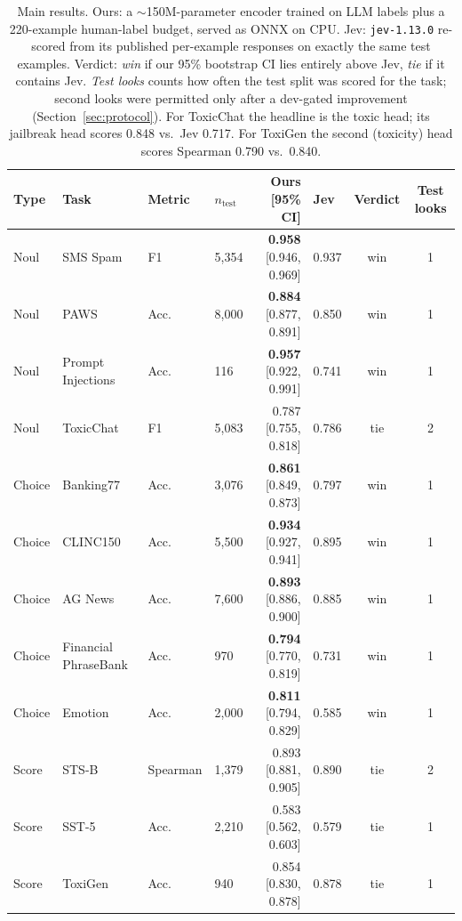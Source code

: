 \begin{table}[t]
\centering\small
\begin{tabular}{llllrlcc}
\toprule
Type & Task & Metric & $n_{\text{test}}$ & Ours [95\% CI] & Jev & Verdict & Test looks \\
\midrule
Noul & SMS Spam & F1 & 5,354 & \textbf{0.958} {\scriptsize[0.946, 0.969]} & 0.937 & win & 1 \\
Noul & PAWS & Acc. & 8,000 & \textbf{0.884} {\scriptsize[0.877, 0.891]} & 0.850 & win & 1 \\
Noul & Prompt Injections & Acc. & 116 & \textbf{0.957} {\scriptsize[0.922, 0.991]} & 0.741 & win & 1 \\
Noul & ToxicChat & F1 & 5,083 & 0.787 {\scriptsize[0.755, 0.818]} & 0.786 & tie & 2 \\
Choice & Banking77 & Acc. & 3,076 & \textbf{0.861} {\scriptsize[0.849, 0.873]} & 0.797 & win & 1 \\
Choice & CLINC150 & Acc. & 5,500 & \textbf{0.934} {\scriptsize[0.927, 0.941]} & 0.895 & win & 1 \\
Choice & AG News & Acc. & 7,600 & \textbf{0.893} {\scriptsize[0.886, 0.900]} & 0.885 & win & 1 \\
Choice & Financial PhraseBank & Acc. & 970 & \textbf{0.794} {\scriptsize[0.770, 0.819]} & 0.731 & win & 1 \\
Choice & Emotion & Acc. & 2,000 & \textbf{0.811} {\scriptsize[0.794, 0.829]} & 0.585 & win & 1 \\
Score & STS-B & Spearman & 1,379 & 0.893 {\scriptsize[0.881, 0.905]} & 0.890 & tie & 2 \\
Score & SST-5 & Acc. & 2,210 & 0.583 {\scriptsize[0.562, 0.603]} & 0.579 & tie & 1 \\
Score & ToxiGen & Acc. & 940 & 0.854 {\scriptsize[0.830, 0.878]} & 0.878 & tie & 1 \\
\bottomrule
\end{tabular}
\caption{Main results. Ours: a $\sim$150M-parameter encoder trained on LLM labels plus a 220-example human-label budget, served as ONNX on CPU. Jev: \texttt{jev-1.13.0} re-scored from its published per-example responses on exactly the same test examples. Verdict: \emph{win} if our 95\% bootstrap CI lies entirely above Jev, \emph{tie} if it contains Jev. \emph{Test looks} counts how often the test split was scored for the task; second looks were permitted only after a dev-gated improvement (Section~\ref{sec:protocol}). For ToxicChat the headline is the toxic head; its jailbreak head scores 0.848 vs.\ Jev 0.717. For ToxiGen the second (toxicity) head scores Spearman 0.790 vs.\ 0.840.}
\label{tab:main}
\end{table}
